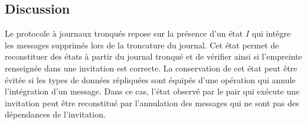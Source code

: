 








\subsection{Discussion}

Le protocole à journaux tronqués repose sur la présence d'un état $I$ qui intègre les messages supprimés lors de la troncature du journal.
Cet état permet de reconstituer des états à partir du journal tronqué et de vérifier ainsi si l'empreinte renseignée dans une invitation est correcte.
La conservation de cet état peut être évitée si les types de données répliquées sont équipés d'une opération qui annule l'intégration d'un message.
Dans ce cas, l'état observé par le pair qui exécute une invitation peut être reconstitué par l'annulation des messages qui ne sont pas des dépendances de l'invitation.

